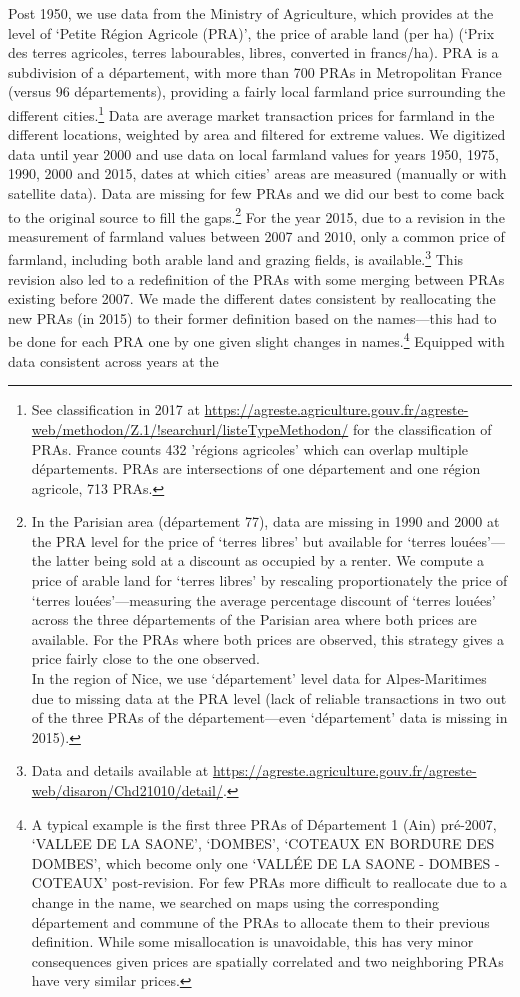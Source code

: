 \documentclass[11pt]{report}
\begin{document}
Post 1950, we use data from the Ministry of Agriculture, which provides at the level of `Petite Région Agricole (PRA)', the price of arable land (per ha) (`Prix des terres agricoles, terres labourables, libres, converted in francs/ha). PRA is a subdivision of a département, with more than 700 PRAs in Metropolitan France (versus 96 départements), providing a fairly local farmland price surrounding the different cities.\footnote{See classification in 2017 at \url{https://agreste.agriculture.gouv.fr/agreste-web/methodon/Z.1/!searchurl/listeTypeMethodon/} for the classification of PRAs. France counts 432 'régions agricoles' which can overlap multiple départements. PRAs are intersections of one département and one région agricole, 713 PRAs.}  Data are average market transaction prices for farmland in the different locations, weighted by area and filtered for extreme values. We digitized data until year 2000 and use data on local farmland values for years 1950, 1975, 1990, 2000 and 2015, dates at which cities' areas are measured (manually or with satellite data). Data are missing for few PRAs and we did our best to come back to the original source to fill the gaps.\footnote{In the Parisian area (département 77), data are missing in 1990 and 2000 at the PRA level for the price of `terres libres' but available for `terres louées'---the latter being sold at a discount as occupied by a renter. We compute a price of arable land for `terres libres' by rescaling proportionately the price of `terres louées'---measuring the average percentage discount of `terres louées' across the three départements of the Parisian area where both prices are available. For the PRAs where both prices are observed, this strategy gives a price fairly close to the one observed.\\In the region of Nice, we use `département' level data for Alpes-Maritimes due to missing data at the PRA level (lack of reliable transactions in two out of the three PRAs of the département---even `département' data is missing in 2015).} For the year 2015, due to a revision in the measurement of farmland values between 2007 and 2010, only a common price of farmland, including both arable land and grazing fields, is available.\footnote{Data and details available at \url{https://agreste.agriculture.gouv.fr/agreste-web/disaron/Chd21010/detail/}.}  This revision also led to a redefinition of the PRAs with some merging between PRAs existing before 2007. We made the different dates consistent by reallocating the new PRAs (in 2015) to their former definition based on the names---this had to be done for each PRA one by one given slight changes in names.\footnote{A typical example is the first three PRAs of Département 1 (Ain) pré-2007, `VALLEE DE LA SAONE', `DOMBES', `COTEAUX EN BORDURE DES DOMBES', which become only one `VALLÉE DE LA SAONE - DOMBES - COTEAUX' post-revision. For few PRAs more difficult to reallocate due to a change in the name, we searched on maps using the corresponding département and commune of the PRAs to allocate them to their previous definition. While some misallocation is unavoidable, this has very minor consequences given prices are spatially correlated and two neighboring PRAs have very similar prices.} Equipped with data consistent across years at the 
\end{document}
